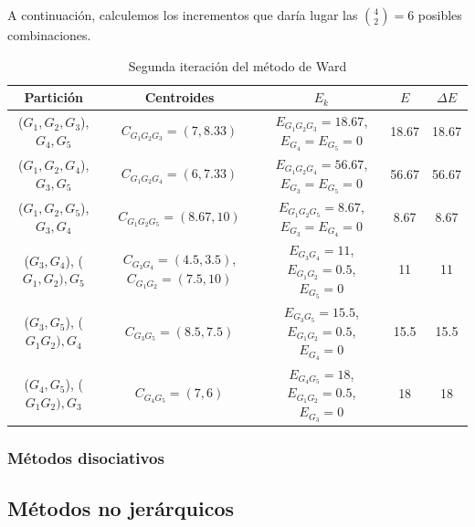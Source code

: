 \begin{ejemplo}
    A continuación, calculemos los incrementos que daría lugar las $\binom{4}{2} = 6$ posibles combinaciones.

    \begin{table}[h]
        \centering
        \begin{tabular}{|c|c|c|c|c|}
            \hline
            \textbf{Partici\'on} & \textbf{Centroides} & \textbf{$E_k$} & \textbf{$E$} & \textbf{$\Delta E$} \\
            \hline
            ($G_{1},G_{2}, G_{3}$), $G_{4}, G_{5}$ & $C_{G_{1}G_{2}G_{3}} = (7, 8.33)$ & $E_{G_{1}G_{2}G_{3}} = 18.67$, $E_{G_{4}}=E_{G_{5}}=0$ & 18.67 & 18.67 \\
            \hline
            ($G_{1},G_{2}, G_{4}$), $G_{3}, G_{5}$ & $C_{G_{1}G_{2}G_{4}} = (6, 7.33)$ & $E_{G_{1}G_{2}G_{4}} = 56.67$,$E_{G_{3}}=E_{G_{5}}=0$ & 56.67 & 56.67 \\
            \hline
            ($G_{1},G_{2}, G_{5}$), $G_{3}, G_{4}$ & $C_{G_{1}G_{2}G_{5}} = (8.67, 10)$ & $E_{G_{1}G_{2}G_{5}} = 8.67$,$E_{G_{3}}=E_{G_{4}}=0$ & 8.67 & 8.67 \\
            \hline
            ($G_{3}, G_{4}$), ($G_{1},G_{2}), G_{5}$ & $C_{G_{3}G_{4}} = (4.5, 3.5)$, $C_{G_{1}G_{2}} = (7.5, 10)$ & $E_{G_{3}G_{4}} = 11$,$E_{G_{1}G_{2}} = 0.5$,$E_{G_{5}}=0$ & 11 & 11 \\  %
            \hline
            ($G_{3}, G_{5}$), ($G_{1}G_{2}), G_{4}$ & $C_{G_{3}G_{5}} = (8.5, 7.5)$ & $E_{G_{3}G_{5}}= 15.5$,$E_{G_{1}G_{2}} = 0.5$,$E_{G_{4}}=0$ & 15.5 & 15.5 \\
            \hline
            ($G_{4}, G_{5}$), ($G_{1}G_{2}), G_{3}$ & $C_{G_{4}G_{5}} = (7, 6)$ & $E_{G_{4}G_5} = 18$,$E_{G_{1}G_{2}} = 0.5$,$E_{G_{3}}=0$ & 18 & 18 \\
            \hline
        \end{tabular}
        \caption{Segunda iteración del método de Ward}
        \label{tab:ward2}
    \end{table}

\end{ejemplo}


\subsubsection{Métodos disociativos}

\subsection{Métodos no jerárquicos}


